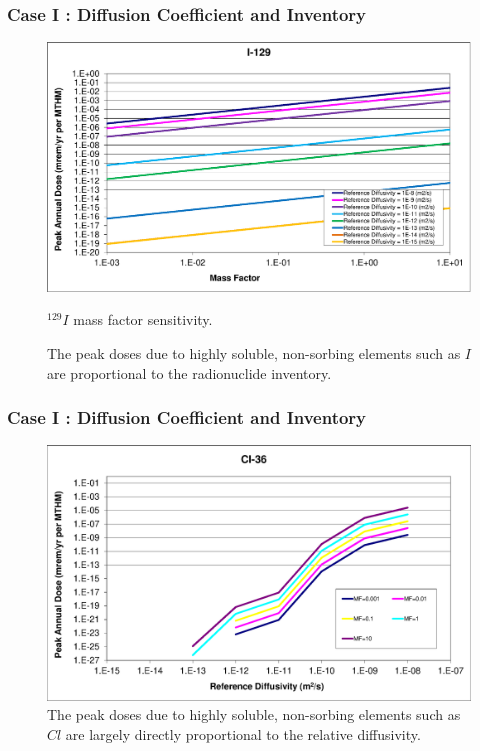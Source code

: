 \begin{frame}[c]
  \frametitle{Case I : Diffusion Coefficient and Inventory}
\begin{figure}[ht]
\centering
\includegraphics[width=\linewidth]{DiffCoeffAndInvEBSFail/I-129-MF.eps}
\caption{$^{129}I$ mass factor sensitivity.}
\caption{The peak doses due to highly soluble, non-sorbing elements such as $I$ 
are  proportional to the radionuclide inventory.}
\label{fig:DCInvI129MF}
\end{figure}
\end{frame}

\begin{frame}[c]
  \frametitle{Case I : Diffusion Coefficient and Inventory}

\begin{figure}[ht]
\centering
\includegraphics[width=\linewidth]{DiffCoeffAndInvEBSFail/Cl-36.eps}
\caption{The peak doses due to highly soluble, non-sorbing elements such as $Cl$ 
are largely directly proportional to the relative diffusivity.  }
\label{fig:DCInvCl36}
\end{figure}
\end{frame}

